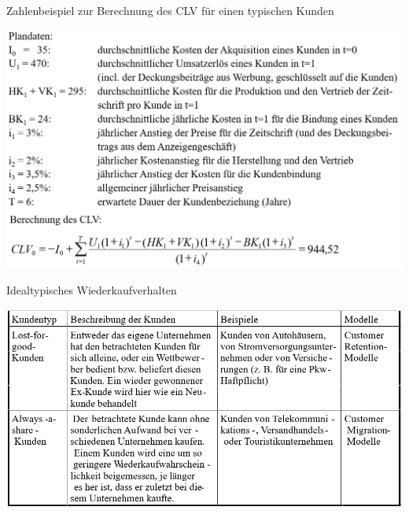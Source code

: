 \documentclass[12pt,ngerman,a4paper,ignorenonframetext,]{beamer}
\begin{document}
\begin{frame}{Zahlenbeispiel zur Berechnung des CLV für einen typischen
Kunden}
\protect\hypertarget{zahlenbeispiel-zur-berechnung-des-clv-fur-einen-typischen-kunden}{}

\begin{center}\includegraphics[width=0.8\linewidth]{./images/Marketingcontrolling/CLV4} \end{center}

\end{frame}

\begin{frame}{Idealtypisches Wiederkaufverhalten}
\protect\hypertarget{idealtypisches-wiederkaufverhalten}{}

\begin{center}\includegraphics[width=0.8\linewidth]{./images/Marketingcontrolling/CLV5} \end{center}

\end{frame}
\end{document}
